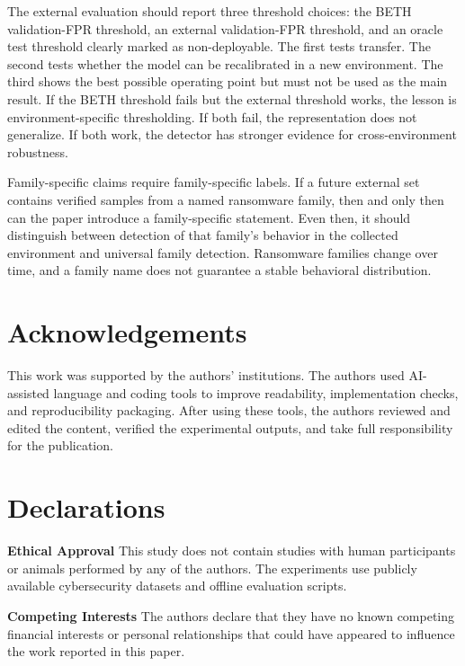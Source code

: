 \documentclass[journal]{IEEEtran}
\begin{document}
The external evaluation should report three threshold choices: the BETH validation-FPR threshold, an external validation-FPR threshold, and an oracle test threshold clearly marked as non-deployable. The first tests transfer. The second tests whether the model can be recalibrated in a new environment. The third shows the best possible operating point but must not be used as the main result. If the BETH threshold fails but the external threshold works, the lesson is environment-specific thresholding. If both fail, the representation does not generalize. If both work, the detector has stronger evidence for cross-environment robustness.

Family-specific claims require family-specific labels. If a future external set contains verified samples from a named ransomware family, then and only then can the paper introduce a family-specific statement. Even then, it should distinguish between detection of that family's behavior in the collected environment and universal family detection. Ransomware families change over time, and a family name does not guarantee a stable behavioral distribution.

\section*{Acknowledgements}
This work was supported by the authors' institutions. The authors used AI-assisted language and coding tools to improve readability, implementation checks, and reproducibility packaging. After using these tools, the authors reviewed and edited the content, verified the experimental outputs, and take full responsibility for the publication.

\section*{Declarations}
\begin{sloppypar}
\noindent\textbf{Ethical Approval} This study does not contain studies with human participants or animals performed by any of the authors. The experiments use publicly available cybersecurity datasets and offline evaluation scripts.
\end{sloppypar}

\noindent
\begin{sloppypar}
\textbf{Competing Interests} The authors declare that they have no known competing financial interests or personal relationships that could have appeared to influence the work reported in this paper.
\end{sloppypar}
\end{document}
